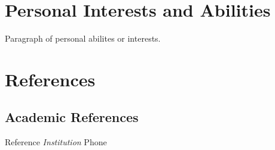 \documentclass[11pt,a4paper,sans]{moderncv}
\begin{document}
  \section{Personal Interests and Abilities}
  Paragraph of personal abilites or interests.

  \section{References}
  \subsection{Academic References}
  Reference \hspace{80pt} \textit{Institution} \hspace{80pt} Phone
\end{document}
